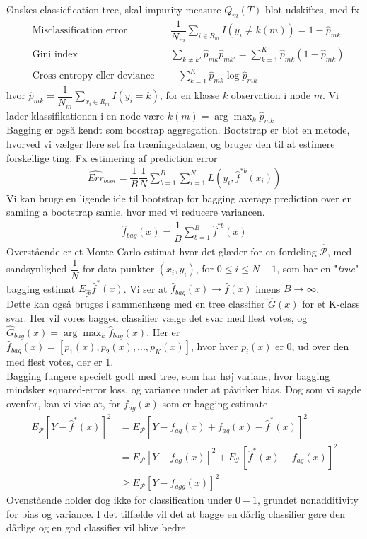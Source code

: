 \documentclass[paper=a4, fontsize=11pt]{scrartcl} %
\numberwithin{equation}{section} %
\numberwithin{figure}{section} %
\numberwithin{table}{section} %
\begin{document}
	Ønskes classicfication tree, skal impurity measure $Q_m(T)$ blot udskiftes, med fx
	\begin{align*}
	&\text{Misclassification error} &&\dfrac{1}{N_m}\sum_{i\in R_m}I(y_i\not=k(m))=1-\hat{p}_{mk}\\
	&\text{Gini index} &&\sum_{k\not=k'}\hat{p}_{mk}\hat{p}_{mk'}=\sum^K_ {k=1}\hat{p}_{mk}(1-\hat{p}_{mk}) \\
	&\text{Cross-entropy eller deviance} &&-\sum_{k=1}^{K}\hat{p}_{mk}\log\hat{p}_{mk}
	\end{align*}
	hvor $\hat{p}_{mk}=\dfrac{1}{N_m}\sum_{x_i\in R_m}I(y_i=k)$, for en klasse $k$ observation i node $m$. Vi lader klassifikationen i en node være $k(m)=\arg\max_k\hat{p}_{mk}$ \\
	
	Bagging er også kendt som boostrap aggregation. Bootstrap er blot en metode, hvorved vi vælger flere set fra træningsdataen, og bruger den til at estimere forskellige ting. Fx estimering af prediction error
	\begin{align*}
	\widehat{Err}_{boot}=\dfrac{1}{B}\dfrac{1}{N}\sum_{b=1}^{B}\sum_{i=1}^{N}L(y_i,\hat{f}^{*b}(x_i))
	\end{align*}
	Vi kan bruge en ligende ide til bootstrap for bagging average prediction over en samling a bootstrap samle, hvor med vi reducere variancen.
	\begin{align*}
	\hat{f}_{bag}(x)=\dfrac{1}{B}\sum_{b=1}^{B}\hat{f}^{*b}(x)
	\end{align*}
	Overstående er et Monte Carlo estimat hvor det glæder for en fordeling $\widehat{\mathcal{P}}$, med sandsynlighed $\dfrac{1}{N}$ for data punkter $(x_i,y_i)$, for $0\leq i\leq N-1$, som har en "\textit{true}" bagging estimat $E_{\hat{\mathcal{P}}}\hat{f}^*(x)$. Vi ser at $\hat{f}_{bag}(x)\rightarrow\hat{f}(x)$ imens $B\rightarrow \infty$. \\
	
	Dette kan også bruges i sammenhæng med en tree classifier $\hat{G}(x)$ for et K-class svar. Her vil vores bagged classifier vælge det svar med flest votes, og $\hat{G}_{bag}(x)=\arg\max_k\hat{f}_{bag}(x)$. Her er $\hat{f}_{bag}(x)=[p_1(x),p_2(x),...,p_K(x)]$, hvor hver $p_i(x)$ er 0, ud over den med flest votes, der er 1. \\
	
	Bagging fungere specielt godt med tree, som har høj varians, hvor bagging mindsker squared-error loss, og variance under at påvirker bias. Dog som vi sagde ovenfor, kan vi vise at, for $f_{ag}(x)$ som er bagging estimate
	\begin{align*}
	E_\mathcal{P}[Y-\hat{f}^*(x)]^2 &= E_\mathcal{P}[Y-f_{ag}(x)+f_{ag}(x)-\hat{f}^*(x)]^2 \\
	& = E_\mathcal{P}[Y-f_{ag}(x)]^2+E_\mathcal{P}[\hat{f}^*(x)-f_{ag}(x)]^2 \\
	&\geq E_\mathcal{P}[Y-f_{agg}(x)]^2
	\end{align*}
	Ovenstående holder dog ikke for classification under $0-1$, grundet nonadditivity for bias og variance. I det tilfælde vil det at bagge en dårlig classifier gøre den dårlige og en god classifier vil blive bedre. \\
	
\end{document}

